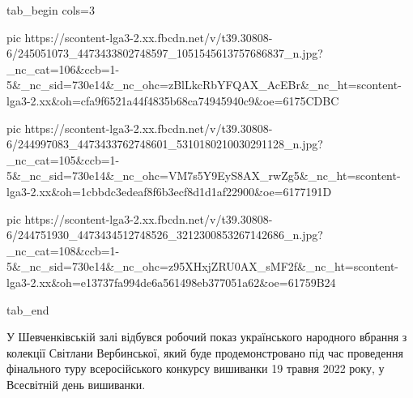 \ifcmt
  tab_begin cols=3

     pic https://scontent-lga3-2.xx.fbcdn.net/v/t39.30808-6/245051073_4473433802748597_1051545613757686837_n.jpg?_nc_cat=106&ccb=1-5&_nc_sid=730e14&_nc_ohc=zBlLkcRbYFQAX_AcEBr&_nc_ht=scontent-lga3-2.xx&oh=cfa9f6521a44f4835b68ca74945940c9&oe=6175CDBC

     pic https://scontent-lga3-2.xx.fbcdn.net/v/t39.30808-6/244997083_4473433762748601_5310180210030291128_n.jpg?_nc_cat=105&ccb=1-5&_nc_sid=730e14&_nc_ohc=VM7s5Y9EyS8AX_rwZg5&_nc_ht=scontent-lga3-2.xx&oh=1cbbdc3edeaf8f6b3ecf8d1d1af22900&oe=6177191D

     pic https://scontent-lga3-2.xx.fbcdn.net/v/t39.30808-6/244751930_4473434512748526_3212300853267142686_n.jpg?_nc_cat=108&ccb=1-5&_nc_sid=730e14&_nc_ohc=z95XHxjZRU0AX_sMF2f&_nc_ht=scontent-lga3-2.xx&oh=e13737fa994de6a561498eb377051a62&oe=61759B24

  tab_end
\fi

У Шевченківській залі відбувся робочий показ українського народного вбрання з
колекції Світлани Вербинської, який буде продемонстровано під час проведення
фінального туру всеросійського конкурсу вишиванки 19 травня 2022 року, у
Всесвітній день вишиванки.
